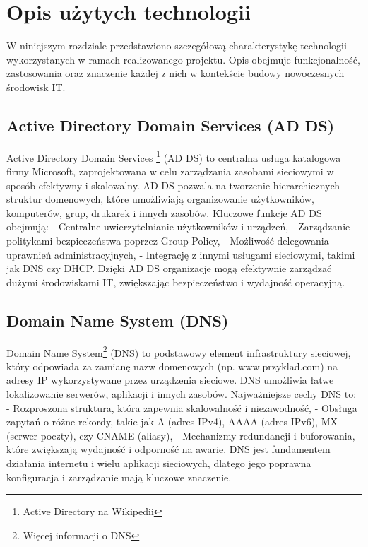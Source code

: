 \newpage
\section{Opis użytych technologii}		%


W niniejszym rozdziale przedstawiono szczegółową charakterystykę technologii wykorzystanych w ramach realizowanego projektu. Opis obejmuje funkcjonalność, zastosowania oraz znaczenie każdej z nich w kontekście budowy nowoczesnych środowisk IT.

\subsection{Active Directory Domain Services (AD DS)}
Active Directory Domain Services \footnote{Active Directory na Wikipedii\cite{ActiveDirectory}} (AD DS) to centralna usługa katalogowa firmy Microsoft, zaprojektowana w celu zarządzania zasobami sieciowymi w sposób efektywny i skalowalny. AD DS pozwala na tworzenie hierarchicznych struktur domenowych, które umożliwiają organizowanie użytkowników, komputerów, grup, drukarek i innych zasobów. Kluczowe funkcje AD DS obejmują:
- Centralne uwierzytelnianie użytkowników i urządzeń,
- Zarządzanie politykami bezpieczeństwa poprzez Group Policy,
- Możliwość delegowania uprawnień administracyjnych,
- Integrację z innymi usługami sieciowymi, takimi jak DNS czy DHCP.
Dzięki AD DS organizacje mogą efektywnie zarządzać dużymi środowiskami IT, zwiększając bezpieczeństwo i wydajność operacyjną.

\subsection{Domain Name System (DNS)}
Domain Name System\footnote{Więcej informacji o DNS\cite{dns}} (DNS) to podstawowy element infrastruktury sieciowej, który odpowiada za zamianę nazw domenowych (np. www.przyklad.com) na adresy IP wykorzystywane przez urządzenia sieciowe. DNS umożliwia łatwe lokalizowanie serwerów, aplikacji i innych zasobów. Najważniejsze cechy DNS to:
- Rozproszona struktura, która zapewnia skalowalność i niezawodność,
- Obsługa zapytań o różne rekordy, takie jak A (adres IPv4), AAAA (adres IPv6), MX (serwer poczty), czy CNAME (aliasy),
- Mechanizmy redundancji i buforowania, które zwiększają wydajność i odporność na awarie.
DNS jest fundamentem działania internetu i wielu aplikacji sieciowych, dlatego jego poprawna konfiguracja i zarządzanie mają kluczowe znaczenie.

